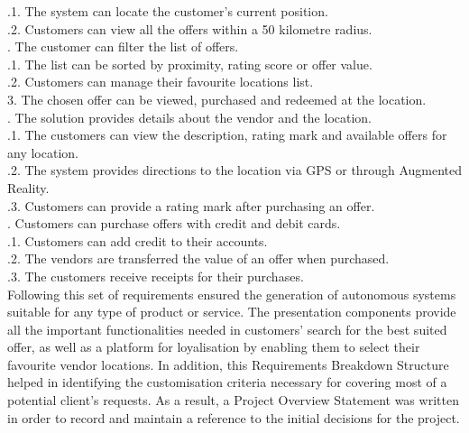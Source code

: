 \indent{}.1. The system can locate the customer's current position.\\
\indent{}.2. Customers can view all the offers within a 50 kilometre radius.\\
. The customer can filter the list of offers.\\
\indent{}.1. The list can be sorted by proximity, rating score or offer value.\\
\indent{}.2. Customers can manage their favourite locations list.\\
3. The chosen offer can be viewed, purchased and redeemed at the location.\\
. The solution provides details about the vendor and the location.\\
\indent{}.1. The customers can view the description, rating mark and available offers for any location.\\
\indent{}.2. The system provides directions to the location via GPS or through Augmented Reality.\\
\indent{}.3. Customers can provide a rating mark after purchasing an offer.\\
. Customers can purchase offers with credit and debit cards.\\
\indent{}.1. Customers can add credit to their accounts.\\
\indent{}.2. The vendors are transferred the value of an offer when purchased.\\
\indent{}.3. The customers receive receipts for their purchases.\\

Following this set of requirements ensured the generation of autonomous systems suitable for any type of product or service. The presentation components provide all the important functionalities needed in customers' search for the best suited offer, as well as a platform for loyalisation by enabling them to select their favourite vendor locations. In addition, this Requirements Breakdown Structure helped in identifying the customisation criteria necessary for covering most of a potential client's requests. As a result, a Project Overview Statement was written in order to record and maintain a reference to the initial decisions for the project.\\

